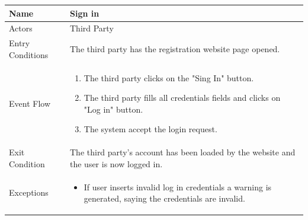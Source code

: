 \begin{enumerate}
\FloatBarrier
\begin{table}[h]
\begin{tabular}{|l|l|}
\hline
Name             & Sign in \\ \hline
Actors           & Third Party  \\ \hline
Entry Conditions & The third party has the registration website page opened.    \\ \hline
Event Flow       & \parbox{.45\textwidth}{\begin{enumerate}
            \item The third party clicks on the "Sing In" button.
            \item The third party fills all credentials fields and clicks on "Log in" button.
            \item The system accept the login request.
        \end{enumerate}}\\ \hline
Exit Condition   & The third party's account has been loaded by the website and the user is now logged in.\\ \hline
Exceptions       & \parbox{.45\textwidth}  
{\begin{itemize}
\item If user inserts invalid log in credentials a warning is generated, saying the credentials are invalid.
\end{itemize}}\\ \hline
\end{tabular}
\end{table}
\FloatBarrier


\end{enumerate}
